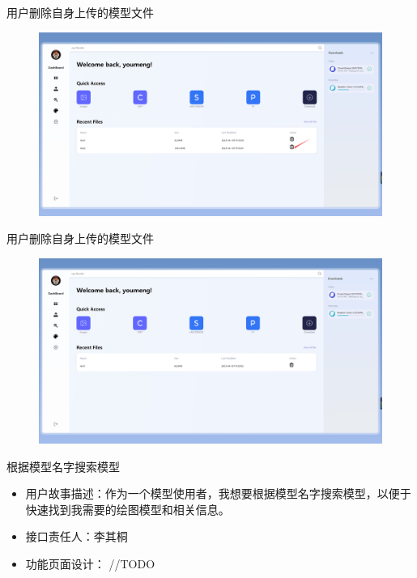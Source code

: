 \begin{frame}{用户删除自身上传的模型文件}
    \begin{figure}[H]
        \centering
        \includegraphics[width=\textwidth]{contents/figure/remove_click.jpg}
    \end{figure}
\end{frame}

\begin{frame}{用户删除自身上传的模型文件}
    \begin{figure}[H]
        \centering
        \includegraphics[width=\textwidth]{contents/figure/remove_result.jpg}
    \end{figure}
\end{frame}

\begin{frame}{根据模型名字搜索模型}
    \begin{itemize}
        \item 用户故事描述：作为一个模型使用者，我想要根据模型名字搜索模型，以便于快速找到我需要的绘图模型和相关信息。
        \item 接口责任人：李其桐
        \item 功能页面设计： //TODO
    \end{itemize}
\end{frame}

